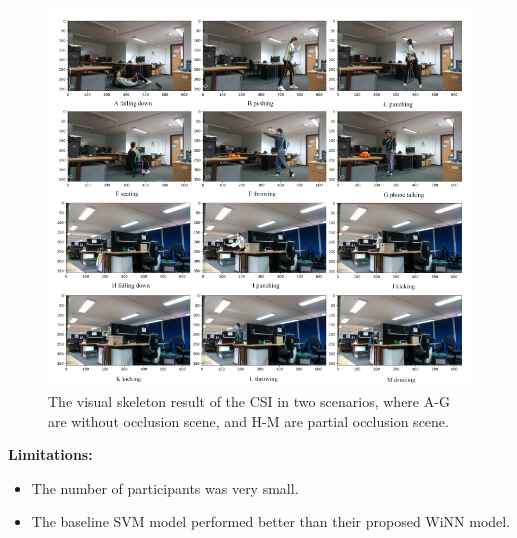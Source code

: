 \begin{figure}[H]
\centering
\includegraphics[width=1\textwidth]{./figure/chap 2/7.png}
\caption{The visual skeleton result of the CSI in two scenarios, where A-G are without occlusion scene, and H-M are partial occlusion scene.}
\label{Fig 2.7}
\end{figure}

 \textbf{Limitations:}

\begin{itemize}
\item The number of participants was very small. 
\item The baseline SVM model performed better than their proposed WiNN model.
\end{itemize}